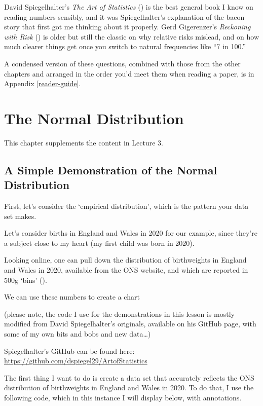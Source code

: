 \documentclass[
]{book}
\begin{document}
David Spiegelhalter's \emph{The Art of Statistics} () is the best general book I know on reading numbers sensibly, and it was Spiegelhalter's explanation of the bacon story that first got me thinking about it properly. Gerd Gigerenzer's \emph{Reckoning with Risk} () is older but still the classic on why relative risks mislead, and on how much clearer things get once you switch to natural frequencies like ``7 in 100.''

A condensed version of these questions, combined with those from the other chapters and arranged in the order you'd meet them when reading a paper, is in Appendix \ref{reader-guide}.

\chapter{The Normal Distribution}\label{norm-dist}

This chapter supplements the content in Lecture 3.

\section{A Simple Demonstration of the Normal Distribution}\label{a-simple-demonstration-of-the-normal-distribution}

First, let's consider the `empirical distribution', which is the pattern your data set makes.

Let's consider births in England and Wales in 2020 for our example, since they're a subject close to my heart (my first child was born in 2020).

Looking online, one can pull down the distribution of birthweights in England and Wales in 2020, available from the ONS website, and which are reported in 500g `bins' ().

We can use these numbers to create a chart

(please note, the code I use for the demonstrations in this lesson is mostly modified from David Spiegelhalter's originals, available on his GitHub page, with some of my own bits and bobs and new data\ldots)

Spiegelhalter's GitHub can be found here: \url{https://github.com/dspiegel29/ArtofStatistics}

The first thing I want to do is create a data set that accurately reflects the ONS distribution of birthweights in England and Wales in 2020. To do that, I use the following code, which in this instance I will display below, with annotations.
\end{document}

